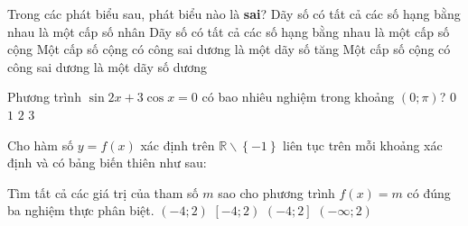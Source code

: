\begin{ex}%
	Trong các phát biểu sau, phát biểu nào là \textbf{sai}?
	\choice
	{Dãy số có tất cả các số hạng bằng nhau là một cấp số nhân}
	{Dãy số có tất cả các số hạng bằng nhau là một cấp số cộng}
	{Một cấp số cộng có công sai dương là một dãy số tăng}
	{\True Một cấp số cộng có công sai dương là một dãy số dương}
	\loigiai{
	}
\end{ex}
\begin{ex}%
	Phương trình $\sin 2x + 3\cos x=0$ có bao nhiêu nghiệm trong khoảng $\left(0; \pi\right)$?
	\choice
	{$0$}
	{\True $1$}
	{$2$}
	{$3$}
	\loigiai{
		$\sin 2x + 3\cos x=0$$\Leftrightarrow $$\cos x\left(2\sin x + 3\right)=0$$\Leftrightarrow $$\left[\begin{aligned}
		& \cos x=0 \\
		& 2\sin x + 3=0 \\
		\end{aligned}\right. \Leftrightarrow \left[\begin{aligned}
		& x=\dfrac{\pi}{2} + k\pi \\
		& PTVN \\
		\end{aligned}\right. \left(k\in Z\right)$. \\
		Trên $\left(0; \pi\right)$ chỉ có $x=\dfrac{\pi}{2}$ thỏa mãn.
	}
\end{ex}
\begin{ex}%
	Cho hàm số $y=f(x)$ xác định trên $\mathbb{R}\backslash \left\{- 1\right\}$ liên tục trên mỗi khoảng xác định và có bảng biến thiên như sau:
\begin{center}
\end{center}
	Tìm tất cả các giá trị của tham số $m$ sao cho phương trình $f(x)=m$ có đúng ba nghiệm thực phân biệt.
	\choice
	{\True $(- 4; 2)$}
	{$\left[- 4; 2\right)$}
	{$\left(- 4; 2\right]$}
	{$\left(- \infty; 2\right)$}
\end{ex}
